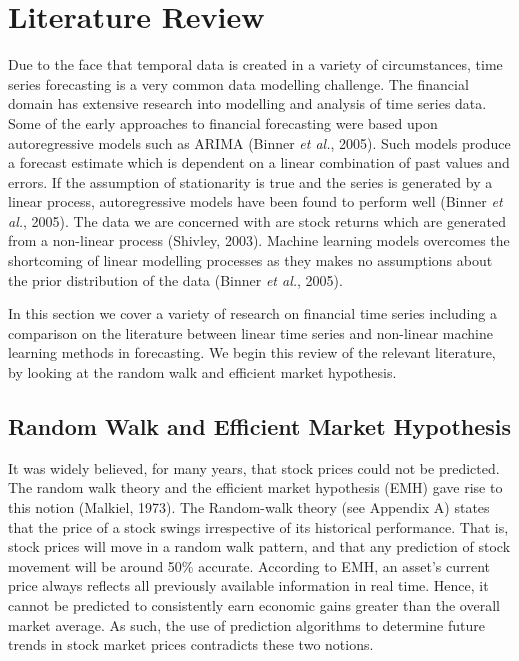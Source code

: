 
\chapter{Literature Review} %

\label{Chapter2} %


Due to the face that temporal data is created in a variety of circumstances, time series forecasting is a very common data modelling challenge. The financial domain has extensive research into modelling and analysis of time series data. Some of the early approaches to financial forecasting were based upon autoregressive models such as ARIMA (Binner \textit{et al.}, 2005). Such models produce a forecast estimate which is dependent on a linear combination of past values and errors. If the assumption of stationarity is true and the series is generated by a linear process, autoregressive models have been found to perform well (Binner \textit{et al.}, 2005).  The data we are concerned with are stock returns which are generated from a non-linear process (Shivley, 2003). Machine learning models overcomes the shortcoming of linear modelling processes as they makes no assumptions about the prior distribution of the data (Binner \textit{et al.}, 2005). 

In this section we cover a variety of research on financial time series including a comparison on the literature between linear time series and non-linear machine learning methods in forecasting. We begin this review of the relevant literature, by looking at the random walk and efficient market hypothesis. 


\section{Random Walk and Efficient Market Hypothesis}

It was widely believed, for many years, that stock prices could not be predicted. The random walk theory and the efficient market hypothesis (EMH) gave rise to this notion (Malkiel, 1973).  The Random-walk theory (see Appendix A) states that the price of a stock swings irrespective of its historical performance. That is, stock prices will move in a random walk pattern, and that any prediction of stock movement will be around 50\% accurate. According to EMH, an asset's current price always reflects all previously available information in real time. Hence, it cannot be predicted to consistently earn economic gains greater than the overall market average. As such, the use of prediction algorithms to determine future trends in stock market prices contradicts these two notions.

